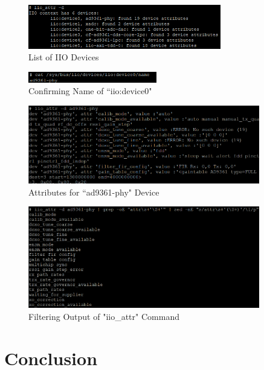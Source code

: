 \documentclass{article}
\begin{document}
\begin{figure}[H]
	\centerline{\includegraphics[width=0.75\textwidth]{iio_devices.png}}
	\caption{List of IIO Devices}
	\label{fig::iio_devices}
\end{figure}

\begin{figure}[H]
	\centerline{\includegraphics[width=0.5\textwidth]{iio_device0_name.png}}
	\caption{Confirming Name of ``iio:device0"}
	\label{fig::iio_device0_name}
\end{figure}

\begin{figure}[H]
	\centerline{\includegraphics[width=0.9\textwidth]{iio_raw_attributes.png}}
	\caption{Attributes for ``ad9361-phy" Device}
	\label{fig::iio_raw_attributes}
\end{figure}

\begin{figure}[H]
	\centerline{\includegraphics[width=0.9\textwidth]{iio_filtered_attributes.png}}
	\caption{Filtering Output of "iio\_attr" Command}
	\label{fig::iio_filtered_attributes}
\end{figure}

\section{Conclusion}

\nocite{analog_devices_libiio_error}

{}
%
	
\end{document}
